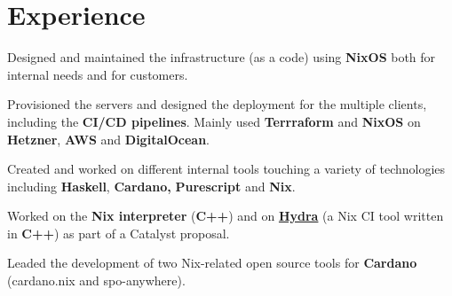 \documentclass[]{cv}
\begin{document}
%
%

%
%

%
%

\begin{minipage}[t]{0.75\textwidth}


\section{Experience}
\vspace{\topsep} %
\begin{tightemize}
\item Designed and maintained the infrastructure (as a code) using \textbf{NixOS} both for internal needs and for customers. 
\item Provisioned the servers and designed the deployment for the multiple clients, including the \textbf{CI/CD pipelines}. Mainly used \textbf{Terrraform} and \textbf{NixOS} on \textbf{Hetzner}, \textbf{AWS} and \textbf{DigitalOcean}.
\item Created and worked on different internal tools touching a variety of technologies including \textbf{Haskell}, \textbf{Cardano,} \textbf{Purescript} and \textbf{Nix}.
\item Worked on the \textbf{Nix interpreter} (\textbf{C++}) and on \href{https://github.com/NixOS/hydra/}{\textbf{Hydra}} (a Nix CI tool written in \textbf{C++}) as part of a Catalyst proposal.
\item Leaded the development of two Nix-related open source tools for \textbf{Cardano} (cardano.nix and spo-anywhere). 
\end{tightemize}
\sectionsep


\end{minipage}
\end{document}
